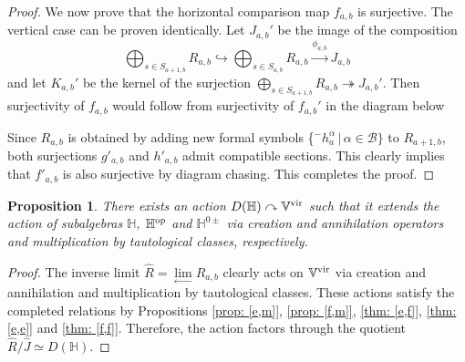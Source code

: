 \documentclass[10pt]{amsart}
\newcommand{\BH}{\mathbb{H}}
\newcommand{\BV}{\mathbb{V}}
\newcommand{\CB}{\mathcal{B}}
\newcommand{\op}{\textnormal{op}}
\newcommand{\+}{{}^+}
\newcommand{\vir}{\textnormal{vir}}
\newtheorem {proposition}[theorem]{Proposition}
\theoremstyle{definition}
\theoremstyle {definition}
\theoremstyle {definition}
\begin{document}
\begin{proof}
We now prove that the horizontal comparison map $f_{a,b}$ is surjective. The vertical case can be proven identically. Let $J_{a,b}'$ be the image of the composition
    $$ \bigoplus_{s\in S_{a+1,b}}R_{a,b}\hookrightarrow \bigoplus_{s\in S_{a,b}}R_{a,b}\xrightarrow{\phi_{a,b}}J_{a,b}
    $$
    and let $K_{a,b}'$ be the kernel of the surjection $\bigoplus_{s\in S_{a+1,b}} R_{a,b}\twoheadrightarrow J_{a,b}'$. Then surjectivity of $f_{a,b}$ would follow from surjectivity of $f_{a,b}'$ in the diagram below
    \begin{center}
    \end{center}
    Since $R_{a,b}$ is obtained by adding new formal symbols \{${}^- h^\alpha_a\,|\,\alpha\in \CB\}$ to $R_{a+1,b}$, both surjections $g'_{a,b}$ and $h'_{a,b}$ admit compatible sections. This clearly implies that $f'_{a,b}$ is also surjective by diagram chasing. This completes the proof. 
\end{proof}


\begin{proposition}\label{prop: doubled algebra action}
    There exists an action $D(\BH)\curvearrowright\BV^\vir$ such that it extends the action of subalgebras $\BH$, $\BH^\op$ and $\BH^{0\pm}$ via creation and annihilation operators and multiplication by tautological classes, respectively.
\end{proposition}
\begin{proof}
The inverse limit $\widehat R=\lim\limits_{\longleftarrow} R_{a,b}$ clearly acts on $\BV^\vir$ via creation and annihilation and multiplication by tautological classes. These actions satisfy the completed relations by Propositions \ref{prop: [e,m]}, \ref{prop: [f,m]}, \ref{thm: [e,f]}, \ref{thm: [e,e]} and \ref{thm: [f,f]}. Therefore, the action factors through the quotient $\widehat R/\widehat J\simeq D(\BH)$. 

\end{proof}
\end{document}
